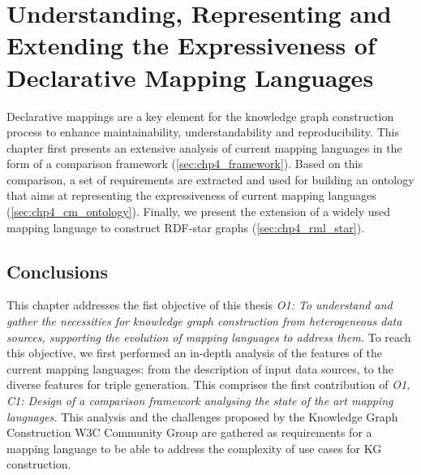 
\chapter{Understanding, Representing and Extending the Expressiveness of Declarative Mapping Languages}
\label{chapter:mappings}

Declarative mappings are a key element for the knowledge graph construction process to enhance maintainability, understandability and reproducibility. This chapter first presents an extensive analysis of current mapping languages in the form of a comparison framework (\cref{sec:chp4_framework}). Based on this comparison, a set of requirements are extracted and used for building an ontology that aims at representing the expressiveness of current mapping languages (\cref{sec:chp4_cm_ontology}). Finally, we present the extension of a widely used mapping language to construct RDF-star graphs (\cref{sec:chp4_rml_star}).








\section{Conclusions}

This chapter addresses the fist objective of this thesis \textit{O1: To understand and gather the necessities for knowledge graph construction from heterogeneous data sources, supporting the evolution of mapping languages to address them.} 
To reach this objective, we first performed an in-depth analysis of the features of the current mapping languages: from the description of input data sources, to the diverse features for triple generation. This comprises the first contribution of \textit{O1, C1: Design of a comparison framework analysing the state of the art mapping languages.}
This analysis and the challenges proposed by the Knowledge Graph Construction W3C Community Group are gathered as requirements for a mapping language to be able to address the complexity of use cases for KG construction. 

